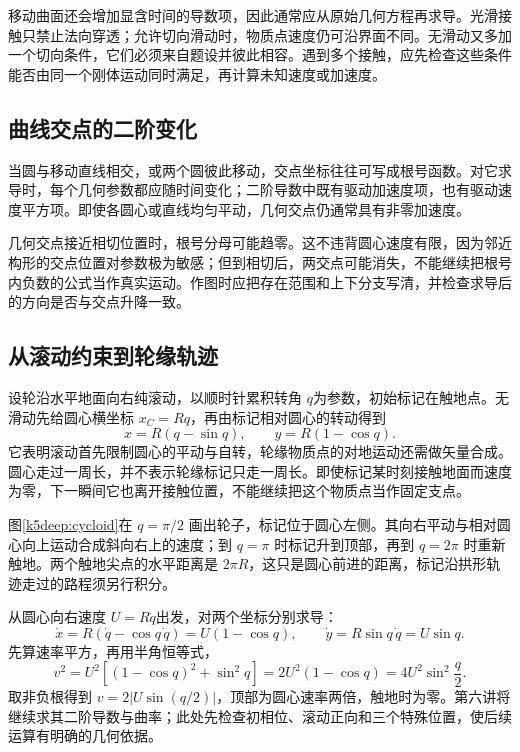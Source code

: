 移动曲面还会增加显含时间的导数项，因此通常应从原始几何方程再求导。光滑接触只禁止法向穿透；允许切向滑动时，物质点速度仍可沿界面不同。无滑动又多加一个切向条件，它们必须来自题设并彼此相容。遇到多个接触，应先检查这些条件能否由同一个刚体运动同时满足，再计算未知速度或加速度。

\subsection{曲线交点的二阶变化}
当圆与移动直线相交，或两个圆彼此移动，交点坐标往往可写成根号函数。对它求导时，每个几何参数都应随时间变化；二阶导数中既有驱动加速度项，也有驱动速度平方项。即使各圆心或直线均匀平动，几何交点仍通常具有非零加速度。

几何交点接近相切位置时，根号分母可能趋零。这不违背圆心速度有限，因为邻近构形的交点位置对参数极为敏感；但到相切后，两交点可能消失，不能继续把根号内负数的公式当作真实运动。作图时应把存在范围和上下分支写清，并检查求导后的方向是否与交点升降一致。

\subsection{从滚动约束到轮缘轨迹}
设轮沿水平地面向右纯滚动，以顺时针累积转角 $q$为参数，初始标记在触地点。无滑动先给圆心横坐标 $x_C=Rq$，再由标记相对圆心的转动得到
\[x=R(q-\sin q),\qquad y=R(1-\cos q).
\]
它表明滚动首先限制圆心的平动与自转，轮缘物质点的对地运动还需做矢量合成。圆心走过一周长，并不表示轮缘标记只走一周长。即使标记某时刻接触地面而速度为零，下一瞬间它也离开接触位置，不能继续把这个物质点当作固定支点。

图\ref{k5deep:cycloid}在 $q=\pi/2$ 画出轮子，标记位于圆心左侧。其向右平动与相对圆心向上运动合成斜向右上的速度；到 $q=\pi$ 时标记升到顶部，再到 $q=2\pi$ 时重新触地。两个触地尖点的水平距离是 $2\pi R$，这只是圆心前进的距离，标记沿拱形轨迹走过的路程须另行积分。

从圆心向右速度 $U=R\dot q$出发，对两个坐标分别求导：
\[
 \dot x=R(\dot q-\cos q\,\dot q)=U(1-\cos q),\qquad
 \dot y=R\sin q\,\dot q=U\sin q.
\]
先算速率平方，再用半角恒等式，
\[
 v^2=U^2[(1-\cos q)^2+\sin^2q]
 =2U^2(1-\cos q)=4U^2\sin^2\frac q2.
\]
取非负根得到 $v=2|U\sin(q/2)|$，顶部为圆心速率两倍，触地时为零。第六讲将继续求其二阶导数与曲率；此处先检查初相位、滚动正向和三个特殊位置，使后续运算有明确的几何依据。


